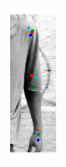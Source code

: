 \begin{figure}[t!]
    \centering
    \newcommand{\vfh}{4cm}
    \includegraphics[height=\vfh]{resources/Fig_Variance/image_1}

\end{figure}
